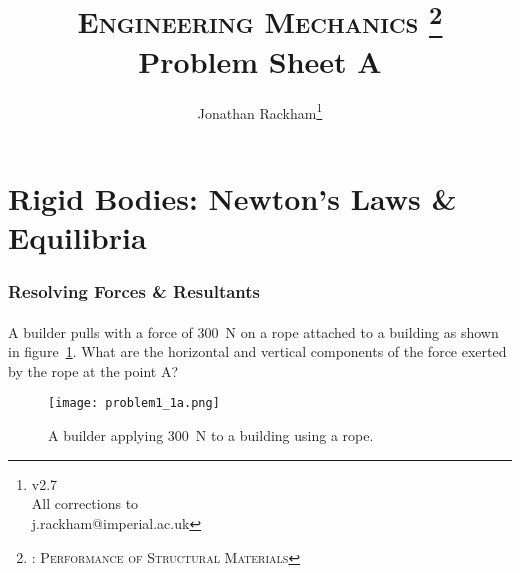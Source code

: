 \documentclass[a4paper,justified,oneside]{tufte-handout}
\numberwithin{equation}{subsection}
\begin{document}
	

\title[MATE40002 Mechanics; Problem Sheet A]{\textsc{Engineering Mechanics}
\thanks{: \textsc{Performance of Structural Materials}}\\Problem Sheet A}

\author[Jonathan Rackham]{Jonathan Rackham\thanks{v2.7\\All corrections to\\ j.rackham@imperial.ac.uk}}

\maketitle

\part{Rigid Bodies: Newton's Laws \& Equilibria}
\section{Resolving Forces \& Resultants}

\subsection{}
A builder pulls with a force of \SI{300}{\N} on a rope attached to a building as shown in figure~\ref{A1:fig:Q1a}. What are the horizontal and vertical components of the force exerted by the rope at the point A?
\begin{figure}
	\centering
	\texttt{[image: problem1\_1a.png]}
	\caption{A builder applying \SI{300}{\N} to a building using a rope.}
	\label{A1:fig:Q1a}
\end{figure}
\end{document}
